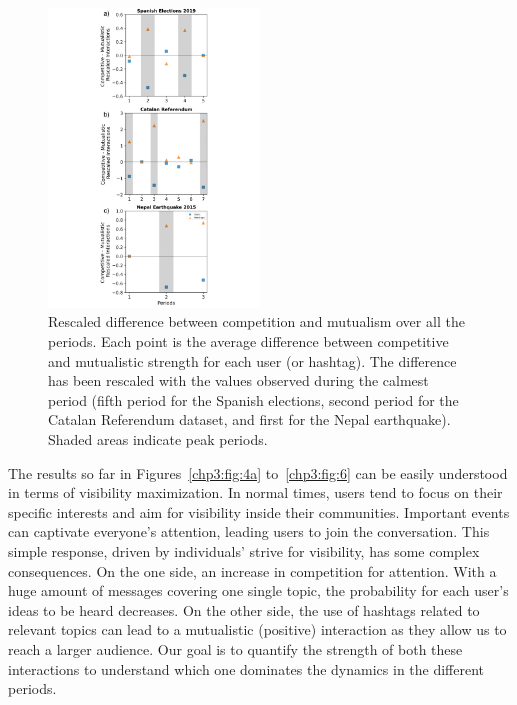 \begin{figure}
    \centering
   \includegraphics[width=0.5\textwidth]{figures/chp3/fig8.pdf}
   
    \caption[Rescaled difference between competition and mutualism]{Rescaled difference between competition and mutualism over all the periods.  Each point is the average difference between competitive and mutualistic strength for each user (or hashtag). The difference has been rescaled with the values observed during the calmest period (fifth period for the Spanish elections, second period for the Catalan Referendum dataset, and first for the Nepal earthquake). Shaded areas indicate peak periods.}
   \label{chp3:fig:8}
\end{figure}


The results so far in Figures~\ref{chp3:fig:4a} to~\ref{chp3:fig:6} can be easily understood in terms of visibility maximization. In normal times, users tend to focus on their specific interests and aim for visibility inside their communities. Important events can captivate everyone's attention, leading users to join the conversation. This simple response, driven by individuals' strive for visibility, has some complex consequences. On the one side, an increase in competition for attention. With a huge amount of messages covering one single topic, the probability for each user's ideas to be heard decreases. On the other side, the use of hashtags related to relevant topics can lead to a mutualistic (positive) interaction as they allow us to reach a larger audience. Our goal is to quantify the strength of both these interactions to understand which one dominates the dynamics in the different periods.  \\


